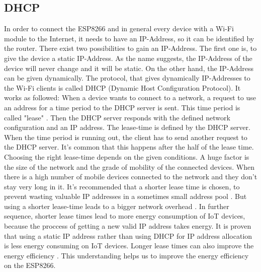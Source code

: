 \subsection{DHCP}
In order to connect the ESP8266 and in general every device with a Wi-Fi module to the Internet, it needs to have an IP-Address, so it can be identified by the router. 
There exist two possibilities to gain an IP-Address. The first one is, to give the device a static IP-Address. As the name suggests, the IP-Address of the device will never change and it will be static. On the other hand, the IP-Address can be given dynamically.
The protocol, that gives dynamically IP-Addresses to the Wi-Fi clients is called DHCP (Dynamic Host Configuration Protocol).
It works as followed: When a device wants to connect to a network, a request to use an address for a time period to the DHCP server is sent. This time period is called "lease" \cite{droms1997rfc2131}. Then the DHCP server responds with the defined network configuration and an IP address.
The lease-time is defined by the DHCP server. When the time period is running out, the client has to send another request to the DHCP server. It's common that this happens after the half of the lease time.
Choosing the right lease-time depends on the given conditions. A huge factor is the size of the network and the grade of mobility of the connected devices. When there is a high number of mobile devices connected to the network and they don't stay very long in it. It's recommended that a shorter lease time is chosen, to prevent wasting valuable IP addresses in a sometimes small address pool \cite{khadilkar2007usage}.
But using a shorter lease-time leads to a bigger network overhead \cite{li_how_2018}. In further sequence, shorter lease times lead to more energy consumption of IoT devices, because the proccess of getting a new valid IP address takes energy.
It is proven that using a static IP address rather than using DHCP for IP address allocation is less energy consuming on IoT devices. Longer lease times can also improve the energy efficiency \cite{department_of_computer_engineering_mehmet_akif_ersoy_university_faculty_of_engineering_and_architecture_burdur_turkey_power_2020}. This understanding helps us to improve the energy efficiency on the ESP8266.



